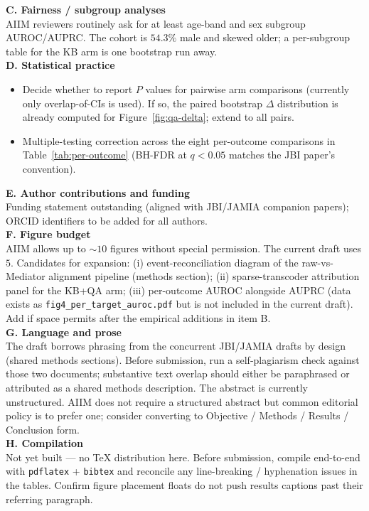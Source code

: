 \begin{center}
{{\textbf{C. Fairness / subgroup analyses}\\
AIIM reviewers routinely ask for at least age-band and sex subgroup
AUROC/AUPRC. The cohort is $54.3\%$ male and skewed older; a
per-subgroup table for the KB arm is one bootstrap run away.\\[.2em]

\textbf{D. Statistical practice}\\
\begin{itemize}\setlength{\itemsep}{.05em}
  \item Decide whether to report $P$ values for pairwise arm comparisons
        (currently only overlap-of-CIs is used). If so, the paired
        bootstrap $\Delta$ distribution is already computed for
        Figure~\ref{fig:qa-delta}; extend to all pairs.
  \item Multiple-testing correction across the eight per-outcome
        comparisons in Table~\ref{tab:per-outcome} (BH-FDR at $q<0.05$
        matches the JBI paper's convention).
\end{itemize}
\vspace{.1em}

\textbf{E. Author contributions and funding}\\
Funding statement outstanding (aligned with JBI/JAMIA companion
papers); ORCID identifiers to be added for all authors.\\[.2em]

\textbf{F. Figure budget}\\
AIIM allows up to $\sim 10$ figures without special permission. The
current draft uses $5$. Candidates for expansion: (i) event-reconciliation
diagram of the raw-vs-Mediator alignment pipeline (methods section);
(ii) sparse-transcoder attribution panel for the KB+QA arm;
(iii) per-outcome AUROC alongside AUPRC (data exists as
\texttt{fig4\_per\_target\_auroc.pdf} but is not included in the current
draft). Add if space permits after the empirical additions in item B.\\[.2em]

\textbf{G. Language and prose}\\
The draft borrows phrasing from the concurrent JBI/JAMIA drafts by
design (shared methods sections). Before submission, run a self-plagiarism
check against those two documents; substantive text overlap should
either be paraphrased or attributed as a shared methods description.
The abstract is currently unstructured. AIIM does not require a
structured abstract but common editorial policy is to prefer one; consider
converting to Objective / Methods / Results / Conclusion form.\\[.2em]

\textbf{H. Compilation}\\
Not yet built --- no TeX distribution here. Before submission, compile
end-to-end with \texttt{pdflatex} + \texttt{bibtex} and reconcile any
line-breaking / hyphenation issues in the tables. Confirm figure
placement floats do not push results captions past their referring
paragraph.
}}
\end{center}

\clearpage
